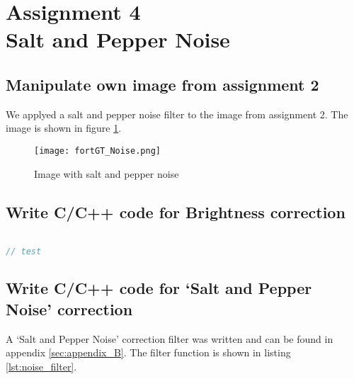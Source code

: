 \section {Assignment 4 \\ {Salt and Pepper Noise}}
\label {sec:assignment_4}

\subsection{Manipulate own image from assignment 2}

We applyed a salt and pepper noise filter to the image from assignment 2. The image is shown in figure \ref{fig:fortGT_Noise}.

\begin{figure}[h!]
    \centering
    \texttt{[image: fortGT\_Noise.png]}
    \caption{Image with salt and pepper noise}
    \label{fig:fortGT_Noise}
\end{figure}

\subsection{Write C/C++ code for Brightness correction}

\begin{lstlisting}[language=C, caption=Noise correction filter, label=lst:noise_filter]

// test

\end{lstlisting}

\subsection{Write C/C++ code for ‘Salt and Pepper Noise’ correction}

A ‘Salt and Pepper Noise’ correction filter was written and can be found in appendix \ref{sec:appendix_B}. The filter function is shown in listing \ref{lst:noise_filter}.

